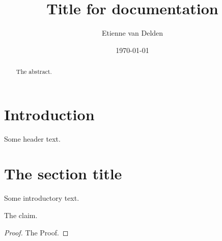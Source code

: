 \documentclass[12pt]{article}
\begin{document}
	
	
	\title{Title for documentation}
	
	\author{Etienne van Delden}
		
	\date{\today}
	
	
	\begin{abstract}
		The abstract.
	\end{abstract}
		
	\maketitle
	
	
	\section*{Introduction}
	
	\begin{header}
		Some header text.    
	\end{header}	
	
	
	\section{The section title} 
	
	Some introductory text. 
	
	\begin{claim}
		\label{The-Claim-title} 
		The claim.
	\end{claim}
	
	\begin{proof}
		The Proof.
	\end{proof}
	
	
	\begin{thebibliography}{XXXX}
		
		
	\end{thebibliography}
	
\end{document}
